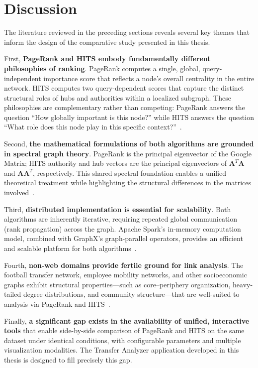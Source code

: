 \section{Discussion}
\label{sec:bg_discussion}

The literature reviewed in the preceding sections reveals several key themes that inform the design of the comparative study presented in this thesis.

First, \textbf{PageRank and HITS embody fundamentally different philosophies of ranking}. PageRank computes a single, global, query-independent importance score that reflects a node's overall centrality in the entire network. HITS computes two query-dependent scores that capture the distinct structural roles of hubs and authorities within a localized subgraph. These philosophies are complementary rather than competing: PageRank answers the question ``How globally important is this node?'' while HITS answers the question ``What role does this node play in this specific context?''~\cite{ijarcce_comparative, ijert_comparative, ijca_hits_pagerank_2024}.

Second, \textbf{the mathematical formulations of both algorithms are grounded in spectral graph theory}. PageRank is the principal eigenvector of the Google Matrix; HITS authority and hub vectors are the principal eigenvectors of $\mathbf{A}^{T}\mathbf{A}$ and $\mathbf{A}\mathbf{A}^{T}$, respectively. This shared spectral foundation enables a unified theoretical treatment while highlighting the structural differences in the matrices involved~\cite{stanford1999pagerank, kleinberg1999hits}.

Third, \textbf{distributed implementation is essential for scalability}. Both algorithms are inherently iterative, requiring repeated global communication (rank propagation) across the graph. Apache Spark's in-memory computation model, combined with GraphX's graph-parallel operators, provides an efficient and scalable platform for both algorithms~\cite{spark_graphx, elmaddah_project}.

Fourth, \textbf{non-web domains provide fertile ground for link analysis}. The football transfer network, employee mobility networks, and other socioeconomic graphs exhibit structural properties---such as core--periphery organization, heavy-tailed degree distributions, and community structure---that are well-suited to analysis via PageRank and HITS~\cite{liu2014football, ieice2016football, employee_arxiv, employee_econstor, employee_duke}.

Finally, \textbf{a significant gap exists in the availability of unified, interactive tools} that enable side-by-side comparison of PageRank and HITS on the same dataset under identical conditions, with configurable parameters and multiple visualization modalities. The Transfer Analyzer application developed in this thesis is designed to fill precisely this gap.
